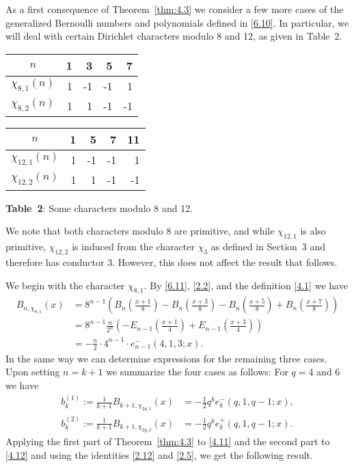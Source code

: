\documentclass{amsart}
\theoremstyle{plain}
\numberwithin{equation}{section}
\begin{document}
As a first consequence of Theorem~\ref{thm:4.3} we consider a few more cases
of the generalized Bernoulli numbers and polynomials defined in \eqref{6.10}.
In particular, we will deal with certain Dirichlet characters modulo 8 and 12, 
as given in Table~2.

\bigskip
\begin{center}
{\renewcommand{\arraystretch}{1.2}
\begin{tabular}{|c|rrrr|}
\hline
$n$ & 1 & 3 & 5 & 7 \\
\hline
$\chi_{8,1}(n)$ & 1 & -1 & -1 & 1 \\
$\chi_{8,2}(n)$ & 1 & 1 & -1 & -1 \\
\hline
\end{tabular}}\quad
{\renewcommand{\arraystretch}{1.2}
\begin{tabular}{|c|rrrr|}
\hline
$n$ & 1 & 5 & 7 & 11 \\
\hline
$\chi_{12,1}(n)$ & 1 & -1 & -1 & 1 \\
$\chi_{12,2}(n)$ & 1 & 1 & -1 & -1 \\
\hline
\end{tabular}}

\medskip
{\bf Table~2}: Some characters modulo 8 and 12.
\end{center}
\bigskip

We note that both characters modulo 8 are primitive, and while $\chi_{12,1}$ is
also primitive, $\chi_{12,2}$ is induced from the character $\chi_3$ as defined
in Section~3 and therefore has conductor 3. However, this does not affect the
result that follows.

We begin with the character $\chi_{8,1}$. By \eqref{6.11}, \eqref{2.2}, and the
definition \eqref{4.1} we have
\begin{align*}
B_{n,\chi_{8,1}}(x) &= 8^{n-1}\left(B_n(\tfrac{x+1}{8})-B_n(\tfrac{x+3}{8})
-B_n(\tfrac{x+5}{8})+B_n(\tfrac{x+7}{8})\right) \\
&=8^{n-1}\frac{n}{2^n}\left(-E_{n-1}(\tfrac{x+1}{4})+E_{n-1}(\tfrac{x+3}{4})\right) \\
&= -\frac{n}{2}\cdot 4^{n-1}\cdot e_{n-1}^{-}(4,1,3;x).
\end{align*}
In the same way we can determine expressions for the remaining three cases. 
Upon setting $n=k+1$ we summarize the four cases as follows: For $q=4$ and 6
we have 
\begin{align}
b_k^{(1)}:=\frac{1}{k+1}B_{k+1,\chi_{2q,1}}(x) 
&= -\frac{1}{2}q^k e_k^{-}(q,1,q-1;x),\label{4.11}\\
b_k^{(2)}:=\frac{1}{k+1}B_{k+1,\chi_{2q,2}}(x) 
&= -\frac{1}{2}q^k e_k^{+}(q,1,q-1;x).\label
{4.12}
\end{align}
Applying the first part of Theorem~\ref{thm:4.3} to \eqref{4.11} and the second
part to \eqref{4.12} and using the identities \eqref{2.12} and \eqref{2.5}, we
get the following result.
\end{document}

